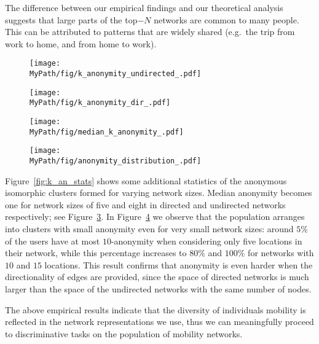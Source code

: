 The difference between our empirical findings and our theoretical analysis suggests that large parts of the top$-N$ networks are common to many people.
This can be attributed to patterns that are widely shared (e.g.\ the trip from work to home, and from home to work).

\begin{figure*}[!t]
	\begin{subfigure}[t]{0.49\textwidth}
		\centering
		\texttt{[image: \\MyPath/fig/k\_anonymity\_undirected\_.pdf]}
		\caption{}
		\label{fig:k_an_un}
	\end{subfigure}%
	\begin{subfigure}[t]{0.49\textwidth}
		\centering
		\texttt{[image: \\MyPath/fig/k\_anonymity\_dir\_.pdf]}
		\caption{}
		\label{fig:k_an_dir}
	\end{subfigure}%
	\caption{{Identifiability set and $k-$anonymity for undirected and directed top$-N$ mobility networks for increasing number of nodes. Displayed is also the theoretical upper bound of identifiability for networks with $ N $ nodes.}
	}
	\label{fig:k_an}
\end{figure*}


\begin{figure*}[!t]
	\begin{subfigure}[t]{0.49\textwidth}
		\centering
		\texttt{[image: \\MyPath/fig/median\_k\_anonymity\_.pdf]}
		\caption{}
		\label{fig:k_an_med}
	\end{subfigure}
	\begin{subfigure}[t]{0.49\textwidth}
		\centering
		\texttt{[image: \\MyPath/fig/anonymity\_distribution\_.pdf]}
		\caption{}
		\label{fig:anon_distribution}
	\end{subfigure}
	\caption{{Anonymity size statistics over the population of top$-N$ mobility networks for increasing network size.}}
	\label{fig:k_an_stats}
\end{figure*}

 Figure~\ref{fig:k_an_stats} shows some additional statistics of the anonymous isomorphic clusters formed for varying network sizes.
 Median anonymity becomes one for network sizes of five and eight in directed and undirected networks respectively; see Figure~\ref{fig:k_an_med}.
 In Figure~\ref{fig:anon_distribution} we observe that the population arranges into clusters with small anonymity even for very small network sizes: around $5\%$  of the users have at most $10$-anonymity when considering only five locations in their network, while this percentage increases to $80\%$ and $100\% $ for networks with $10$ and $15$ locations.
 This result confirms that anonymity is even harder when the directionality of edges are provided, since the space of directed networks is much larger than the space of the undirected networks with the same number of nodes.

 The above empirical results indicate that the diversity of individuals mobility is reflected in the network representations we use, thus we can meaningfully proceed to discriminative tasks on the population of mobility networks.
